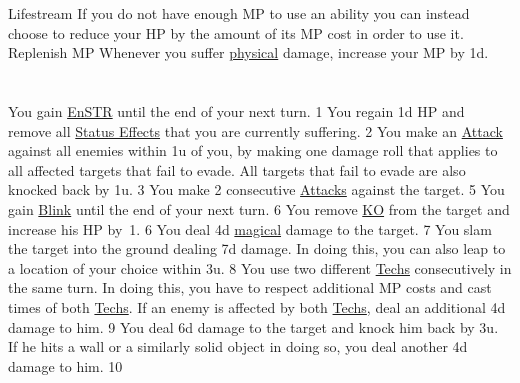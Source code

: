 {Lifestream}
{	
	If you do not have enough MP to use an ability you can instead choose to reduce your HP by the amount of its MP cost in order to use it.
}
{Replenish MP}
{	
	Whenever you suffer \hyperlink{type}{physical} damage, increase your MP by 1d.
}
\pagebreak \\
\\\\
{
	You gain \hyperlink{status}{EnSTR} until the end of your next turn. 
}{\enstr}{1}
{
	You regain 1d HP and remove all \hyperlink{status}{Status Effects} that you are currently suffering.
}{}{2}
{
	You make an \hyperlink{action}{Attack} against all enemies within 1u of you, by making one damage roll that applies to all affected targets that fail to evade. All targets that fail to evade are also knocked back by 1u. 
}{}{3}
{
	You make 2 consecutive \hyperlink{action}{Attacks} against the target. 
}{}{5}
{
	You gain \hyperlink{status}{Blink} until the end of your next turn. 
}{\blink}{6}
{
	You remove \hyperlink{status}{KO} from the target and increase his HP by~1. 
}{\ko}{6}
{
	You deal 4d \hyperlink{type}{magical} damage to the target.
}{}{7}
{
	You slam the target into the ground dealing 7d damage.
	In doing this, you can also leap to a location of your choice within 3u.
}{}{8}
{
	You use two different \hyperlink{action}{Techs} consecutively in the same turn.
	In doing this, you have to respect additional MP costs and cast times of both \hyperlink{action}{Techs}.
	If an enemy is affected by both \hyperlink{action}{Techs}, deal an additional 4d damage to him.
}{}{9}
{
	You deal 6d damage to the target and knock him back by 3u.
	If he hits a wall or a similarly solid object in doing so, you deal another 4d damage to him.
}{}{10}
\pagebreak